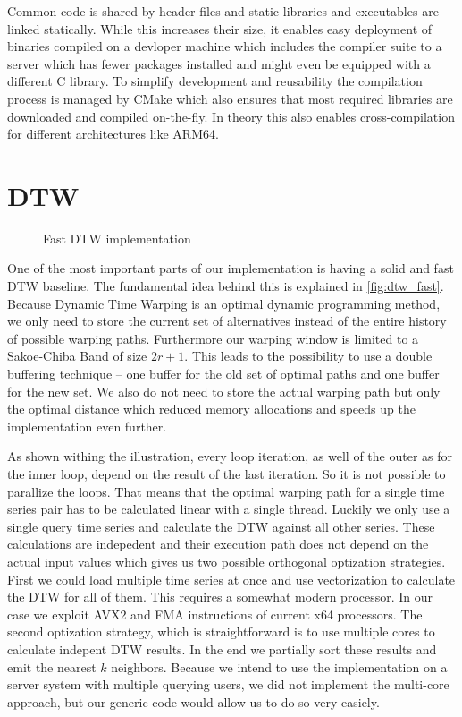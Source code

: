 Common code is shared by header files and static libraries and executables are linked statically. While this increases their size, it enables easy deployment of binaries compiled on a devloper machine which includes the compiler suite to a server which has fewer packages installed and might even be equipped with a different C library. To simplify development and reusability the compilation process is managed by CMake which also ensures that most required libraries are downloaded and compiled on-the-fly. In theory this also enables cross-compilation for different architectures like ARM64.



\section{DTW}
\label{sec:implementation:dtw}

\begin{figure}
    \centering
    
    \caption{Fast DTW implementation}
    \label{fig:dtw_fast}
\end{figure}

One of the most important parts of our implementation is having a solid and fast DTW baseline. The fundamental idea behind this is explained in \autoref{fig:dtw_fast}. Because Dynamic Time Warping is an optimal dynamic programming method, we only need to store the current set of alternatives instead of the entire history of possible warping paths. Furthermore our warping window is limited to a Sakoe-Chiba Band of size $2r + 1$. This leads to the possibility to use a double buffering technique -- one buffer for the old set of optimal paths and one buffer for the new set. We also do not need to store the actual warping path but only the optimal distance which reduced memory allocations and speeds up the implementation even further.

As shown withing the illustration, every loop iteration, as well of the outer as for the inner loop, depend on the result of the last iteration. So it is not possible to parallize the loops. That means that the optimal warping path for a single time series pair has to be calculated linear with a single thread. Luckily we only use a single query time series and calculate the DTW against all other series. These calculations are indepedent and their execution path does not depend on the actual input values which gives us two possible orthogonal optization strategies. First we could load multiple time series at once and use vectorization to calculate the DTW for all of them. This requires a somewhat modern processor. In our case we exploit AVX2 and FMA instructions of current x64 processors. The second optization strategy, which is straightforward is to use multiple cores to calculate indepent DTW results. In the end we partially sort these results and emit the nearest $k$ neighbors. Because we intend to use the implementation on a server system with multiple querying users, we did not implement the multi-core approach, but our generic code would allow us to do so very easiely.


